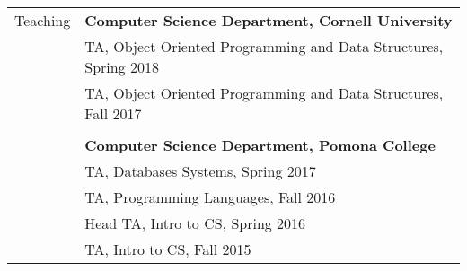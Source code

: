 \documentclass[letterpaper,11pt,oneside]{article}
\begin{document}
\begin{tabular}{@{} l l}
  \Large{Teaching}
  & \textbf{Computer Science Department, Cornell University} \\

  & TA, Object Oriented Programming and Data Structures, Spring 2018 \\
  
  & TA, Object Oriented Programming and Data Structures, Fall 2017 \\
  &\\
  
  & \textbf{Computer Science Department, Pomona College} \\ 
  
  & TA, Databases Systems, Spring 2017 \\

  & TA, Programming Languages, Fall 2016 \\
  
  & Head TA, Intro to CS, Spring 2016 \\
  
  & TA, Intro to CS, Fall 2015 \\


\end{tabular}
\end{document}
